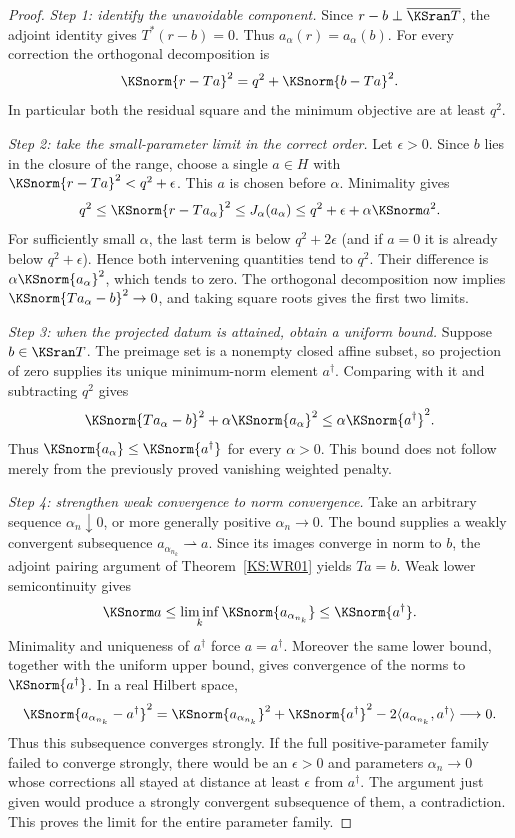 \begin{proof}
\emph{Step 1: identify the unavoidable component.} Since $r-b\perp\overline{\KSran T}$, the adjoint identity gives $T^*(r-b)=0$. Thus $a_\alpha(r)=a_\alpha(b)$. For every correction the orthogonal decomposition is
\[
 \KSnorm{r-Ta}^2=q^2+\KSnorm{b-Ta}^2.
\]
In particular both the residual square and the minimum objective are at least $q^2$.

\emph{Step 2: take the small-parameter limit in the correct order.} Let $\epsilon>0$. Since $b$ lies in the closure of the range, choose a single $a\in H$ with $\KSnorm{r-Ta}^2<q^2+\epsilon$. This $a$ is chosen before $\alpha$. Minimality gives
\[
 q^2\le\KSnorm{r-Ta_\alpha}^2
 \le J_\alpha(a_\alpha)
 \le q^2+\epsilon+\alpha\KSnorm a^2.
\]
For sufficiently small $\alpha$, the last term is below $q^2+2\epsilon$ (and if $a=0$ it is already below $q^2+\epsilon$). Hence both intervening quantities tend to $q^2$. Their difference is $\alpha\KSnorm{a_\alpha}^2$, which tends to zero. The orthogonal decomposition now implies $\KSnorm{Ta_\alpha-b}^2\to0$, and taking square roots gives the first two limits.

\emph{Step 3: when the projected datum is attained, obtain a uniform bound.} Suppose $b\in\KSran T$. The preimage set is a nonempty closed affine subset, so projection of zero supplies its unique minimum-norm element $a^\dagger$. Comparing with it and subtracting $q^2$ gives
\[
 \KSnorm{Ta_\alpha-b}^2+\alpha\KSnorm{a_\alpha}^2
 \le\alpha\KSnorm{a^\dagger}^2.
\]
Thus $\KSnorm{a_\alpha}\le\KSnorm{a^\dagger}$ for every $\alpha>0$. This bound does not follow merely from the previously proved vanishing weighted penalty.

\emph{Step 4: strengthen weak convergence to norm convergence.} Take an arbitrary sequence $\alpha_n\downarrow0$, or more generally positive $\alpha_n\to0$. The bound supplies a weakly convergent subsequence $a_{\alpha_{n_k}}\rightharpoonup a$. Since its images converge in norm to $b$, the adjoint pairing argument of Theorem~\ref{KS:WR01} yields $Ta=b$. Weak lower semicontinuity gives
\[
 \KSnorm a\le\liminf_k\KSnorm{a_{\alpha_{n_k}}}
 \le\KSnorm{a^\dagger}.
\]
Minimality and uniqueness of $a^\dagger$ force $a=a^\dagger$. Moreover the same lower bound, together with the uniform upper bound, gives convergence of the norms to $\KSnorm{a^\dagger}$. In a real Hilbert space,
\[
 \KSnorm{a_{\alpha_{n_k}}-a^\dagger}^2
 =\KSnorm{a_{\alpha_{n_k}}}^2+\KSnorm{a^\dagger}^2
       -2\langle a_{\alpha_{n_k}},a^\dagger\rangle\longrightarrow0.
\]
Thus this subsequence converges strongly. If the full positive-parameter family failed to converge strongly, there would be an $\epsilon>0$ and parameters $\alpha_n\to0$ whose corrections all stayed at distance at least $\epsilon$ from $a^\dagger$. The argument just given would produce a strongly convergent subsequence of them, a contradiction. This proves the limit for the entire parameter family.


\end{proof}
